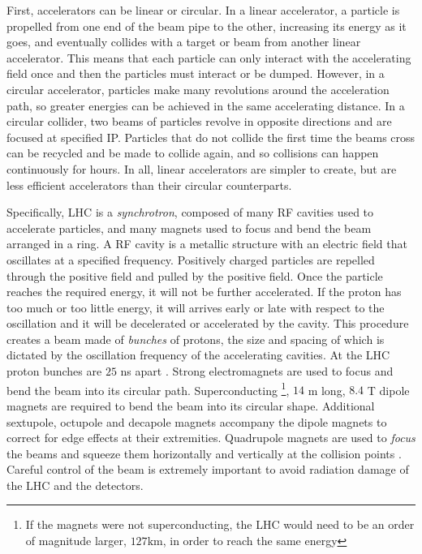 First, accelerators can be linear or circular. In a linear accelerator, a particle is propelled from one end of the beam pipe to the other, increasing its energy as it goes, and eventually collides with a target or beam from another linear accelerator. This means that each particle can only interact with the accelerating field once and then the particles must interact or be dumped. However, in a circular accelerator, particles make many revolutions around the acceleration path, so greater energies can be achieved in the same accelerating distance. In a circular collider, two beams of particles revolve in opposite directions and are focused at specified \ac{IP}. Particles that do not collide the first time the beams cross can be recycled and be made to collide again, and so collisions can happen continuously for hours. In all, linear accelerators are simpler to create, but are less efficient accelerators than their circular counterparts. 


Specifically, \ac{LHC} is a \emph{synchrotron}, composed of many \ac{RF} cavities used to accelerate particles, and many magnets used to focus and bend the beam arranged in a ring. A \ac{RF} cavity is a metallic structure with an electric field that oscillates at a specified frequency. Positively charged particles are repelled through the positive field and pulled by the positive field. Once the particle reaches the required energy, it will not be further accelerated. If the proton has too much or too little energy, it will arrives early or late with respect to the oscillation and it will be decelerated or accelerated by the cavity. This procedure creates a beam made of \emph{bunches} of protons, the size and spacing of which is dictated by the oscillation frequency of the accelerating cavities. At the \ac{LHC} proton bunches are $25$ ns apart \cite{cern-cavities}. Strong electromagnets are used to focus and bend the beam into its circular path. Superconducting \footnote{If the magnets were not superconducting, the \ac{LHC} would need to be an order of magnitude larger, $127 \textrm{km}$, in order to reach the same energy}, $14$ m long, $8.4$ T dipole magnets are required to bend the beam into its circular shape. Additional sextupole, octupole and decapole magnets accompany the dipole magnets to  correct for edge effects at their extremities. Quadrupole magnets are used to \emph{focus} the beams and squeeze them horizontally and vertically at the collision points \cite{cern-magnets}. Careful control of the beam is extremely important to avoid radiation damage of the \ac{LHC} and the detectors. 


